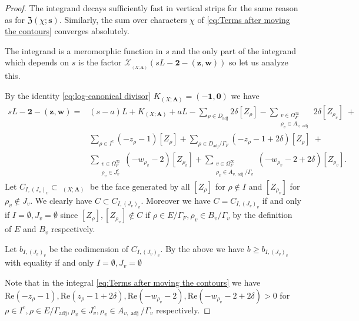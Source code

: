 \documentclass[10pt,a4paper]{amsart}
\DeclareMathOperator{\Eff}{\overline{Eff}}
\DeclareMathOperator{\adj}{adj}
\renewcommand{\Re}{\mathrm{Re}}
\begin{document}
\begin{proof}
	The integrand decays sufficiently fast in vertical strips for the same reason as for $\mathfrak{Z}(\chi ; \bm{s})$. Similarly, the sum over characters $\chi$ of \eqref{eq:Terms after moving the contours} converges absolutely.
	
	The integrand is a meromorphic function in $s$ and the only part of the integrand which depends on $s$ is the factor $\mathcal{X}_{\Eff_{(X; \mathbf{A})}}(s L - \mathbf{2} - (\bm{z}, \bm{w}))$ so let us analyze this.
	
	By the identity \eqref{eq:log-canonical divisor} $K_{(X ; \mathbf{A})} = (-\mathbf{1}, \mathbf{0})$ we have 
	\begin{equation*}
		\begin{split}
			s L - \mathbf{2} - (\bm{z}, \bm{w}) = &(s - a)L + K_{(X; \mathbf{A})} + aL - 
			\sum_{\rho \in D_{\adj}} 2\delta [Z_{\rho}] - 
			\sum_{\substack{v \in \Omega_{F}^{\infty} \\ \rho_v \in A_{v, \adj}}} 2\delta [Z_{\rho_v}] \; + \\
			&\sum_{\rho \in I^c} (- z_{\rho} - 1) [Z_{\rho}] + \sum_{\rho \in D_{\adj}/ \Gamma_{F}} (- z_{\rho} - 1 + 2 \delta) [Z_{\rho}] \; + \\
			&\sum_{\substack{v \in \Omega_{F}^{\infty} \\ \rho_v \in J_v^{c}}} ( - w_{\rho_v} - 2) [Z_{\rho_v}] + \sum_{\substack{v \in \Omega_{F}^{\infty} \\ \rho_v \in A_{v, \adj} / \Gamma_v}} ( - w_{\rho_v} - 2 + 2 \delta) [Z_{\rho_v}].
		\end{split}
	\end{equation*}
	Let $C_{I, (J_v)_v} \subset \Eff_{(X; \mathbf{A})}$ be the face generated by all $[Z_{\rho}]$ for $\rho \not \in I$ and $[Z_{\rho_v}]$ for $\rho_v \not \in J_v$. We clearly have $C \subset C_{I, (J_v)_v}$. Moreover we have $C = C_{I, (J_v)_v}$ if and only if $I = \emptyset, J_v = \emptyset$ since $[Z_{\rho}], [Z_{\rho_v}] \not \in C$ if $\rho \in E/\Gamma_F, \rho_v \in B_v / \Gamma_v$ by the definition of $E$ and $B_v$ respectively.
	
	Let $b_{I, (J_v)_v}$ be the codimension of $C_{I, (J_v)_v}$. By the above we have $b \geq b_{I, (J_v)_v}$ with equality if and only $I = \emptyset, J_v = \emptyset$
	
 	Note that in the integral \eqref{eq:Terms after moving the contours} we have $ \Re(- z_{\rho} - 1), \Re( z_{\rho} - 1 + 2 \delta), \Re( - w_{\rho_v} - 2), \Re( - w_{\rho_v} - 2 + 2 \delta) > 0$ for $\rho \in I^c, \rho \in E / \Gamma_{\adj}, \rho_v \in J_v^c, \rho_v \in A_{v, \adj} / \Gamma_v$ respectively. 
 	

\end{proof}
\end{document}
